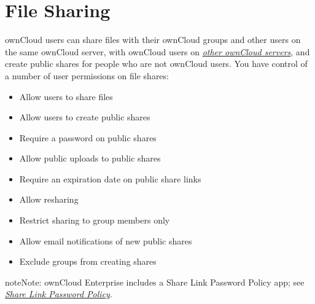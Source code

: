 \documentclass[letterpaper,10pt,english]{sphinxmanual}
\begin{document}
\section{File Sharing}
\label{configuration_files/file_sharing_configuration:file-sharing}\label{configuration_files/file_sharing_configuration::doc}
ownCloud users can share files with their ownCloud groups and other users on
the same ownCloud server, with ownCloud users on {\hyperref[configuration_files/federated_cloud_sharing_configuration::doc]{\emph{other ownCloud servers}}}, and create public shares for people who are not
ownCloud users. You have control of a number of user permissions on file shares:
\begin{itemize}
\item {} 
Allow users to share files

\item {} 
Allow users to create public shares

\item {} 
Require a password on public shares

\item {} 
Allow public uploads to public shares

\item {} 
Require an expiration date on public share links

\item {} 
Allow resharing

\item {} 
Restrict sharing to group members only

\item {} 
Allow email notifications of new public shares

\item {} 
Exclude groups from creating shares

\end{itemize}

\begin{notice}{note}{Note:}
ownCloud Enterprise includes a Share Link Password Policy app; see
{\hyperref[configuration_files/file_sharing_configuration:password-policy-label]{\emph{Share Link Password Policy}}}.
\end{notice}
\end{document}
